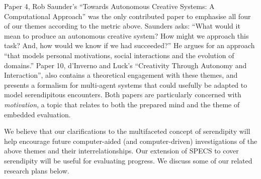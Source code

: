 \medskip



\bigskip

Paper 4, Rob Saunder's \citeyear{saunders2012towards} ``Towards
Autonomous Creative Systems: A Computational Approach'' was the only
contributed paper to emphasise all four of our themes according to the
metric above.  Saunders asks: ``What would it mean to produce an
autonomous creative system? How might we approach this task? And, how
would we know if we had succeeded?''  He argues for an approach ``that
models personal motivations, social interactions and the evolution of
domains.''  Paper 10, d'Inverno and Luck's \citeyear{d2012creativity}
``Creativity Through Autonomy and Interaction'', also contains a
theoretical engagement with these themes, and presents a formalism for
multi-agent systems that could usefully be adapted to model
serendipitous encounters.  Both papers are particularly concerned with
\emph{motivation}, a topic that relates to both the prepared mind and
the theme of embedded evaluation.

We believe that our clarifications to the multifaceted concept of
serendipity will help encourage future computer-aided (and
computer-driven) investigations of the above themes and their
interrelationships.  Our extension of SPECS to cover serendipity will
be useful for evaluating progress.  We discuss some of our related
research plans below.
